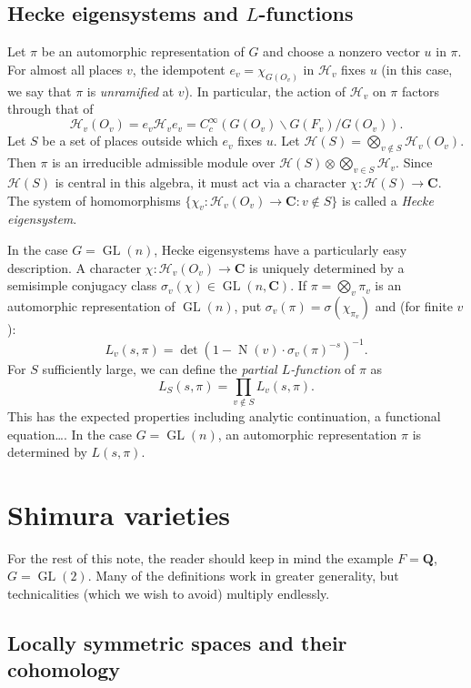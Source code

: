 \documentclass[oneside]{amsart}
\DeclareMathOperator{\GL}{GL}
\DeclareMathOperator{\norm}{N}
\newcommand{\dC}{\mathbf{C}}
\newcommand{\dQ}{\mathbf{Q}}
\newcommand{\hecke}{\mathcal{H}}
\begin{document}
\subsection{Hecke eigensystems and \texorpdfstring{$L$}{L}-functions}

Let $\pi$ be an automorphic representation of $G$ and choose a nonzero vector 
$u$ in $\pi$. For almost all places $v$, the idempotent $e_v=\chi_{G(O_v)}$ in 
$\hecke_v$ fixes $u$ (in this case, we say that $\pi$ is \emph{unramified} at 
$v$). In particular, the action of $\hecke_v$ on $\pi$ factors 
through that of 
\[
  \hecke_v(O_v) = e_v \hecke_v e_v = C_c^\infty(G(O_v)\backslash G(F_v)/G(O_v)) .
\]
Let $S$ be a set of places outside which $e_v$ fixes $u$. Let 
$\hecke(S)=\bigotimes_{v\notin S} \hecke_v(O_v)$. Then $\pi$ is an irreducible 
admissible module over $\hecke(S)\otimes \bigotimes_{v\in S} \hecke_v$. Since 
$\hecke(S)$ is central in this algebra, it must act via a character 
$\chi:\hecke(S)\to \dC$. The system of homomorphisms 
$\{\chi_v:\hecke_v(O_v) \to \dC:v\notin S\}$ is called a \emph{Hecke 
eigensystem}. 

In the case $G=\GL(n)$, Hecke eigensystems have a particularly easy 
description. A character $\chi:\hecke_v(O_v)\to \dC$ is uniquely determined by 
a semisimple conjugacy class $\sigma_v(\chi)\in \GL(n,\dC)$. If 
$\pi=\bigotimes_v \pi_v$ is an automorphic representation of $\GL(n)$, put 
$\sigma_v(\pi) = \sigma(\chi_{\pi_v})$ and (for finite $v$): 
\[
  L_v(s,\pi) = \det\left(1-\norm(v)\cdot \sigma_v(\pi)^{-s}\right)^{-1} .
\]
For $S$ sufficiently large, we can define the \emph{partial $L$-function} of 
$\pi$ as 
\[
  L_S(s,\pi) = \prod_{v\notin S} L_v(s,\pi) .
\]
This has the expected properties including analytic continuation, a functional 
equation\ldots. In the case $G=\GL(n)$, an automorphic representation $\pi$ is 
determined by $L(s,\pi)$. 





\section{Shimura varieties}

For the rest of this note, the reader should keep in mind the example 
$F=\dQ$, $G=\GL(2)$. Many of the definitions work in greater generality, 
but technicalities (which we wish to avoid) multiply endlessly. 


\subsection{Locally symmetric spaces and their cohomology}\label{sec:local-symm}
\end{document}
